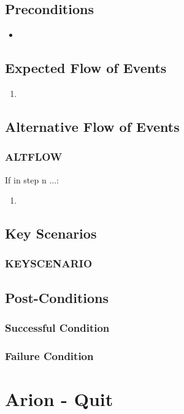 \documentclass{scrreprt}
\begin{document}
\section{Preconditions}
\begin{itemize}
    \item 
\end{itemize}

\section{Expected Flow of Events}
\begin{enumerate}[1.]
    \item 
\end{enumerate}

\section{Alternative Flow of Events}

    \subsection{ALTFLOW}
    If in step n ...:
    \begin{enumerate}
        \item 
    \end{enumerate}

\section{Key Scenarios}
    \subsection{KEYSCENARIO}

\section{Post-Conditions}
    \subsection{Successful Condition}
    
    \subsection{Failure Condition}


\chapter{Arion - Quit}
\end{document}
